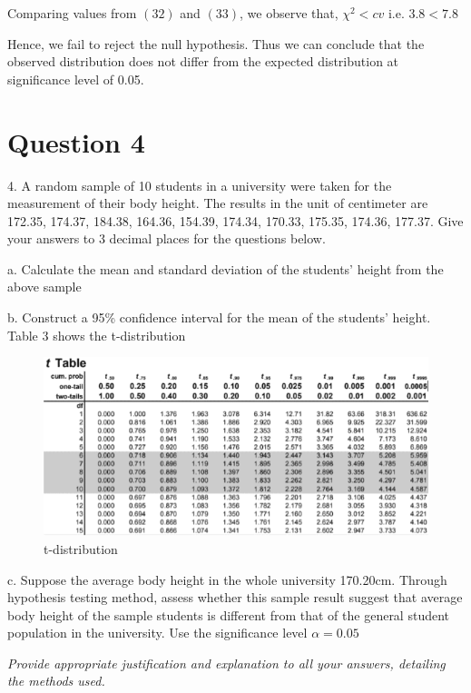 \documentclass[a4paper]{report}
\begin{document}
Comparing values from $(32)$ and $(33)$, we observe that, $\chi ^2<cv$ i.e. $3.8<7.8$

Hence, we fail to reject the null hypothesis. Thus we can conclude that the observed distribution does not differ from the expected distribution at significance level of 0.05.



\newpage
\section*{Question 4}

4.	A random sample of 10 students in a university were taken for the measurement of their body height. The results in the unit of centimeter are {172.35, 174.37, 184.38, 164.36, 154.39, 174.34, 170.33, 175.35, 174.36, 177.37}. Give your answers to 3 decimal places for the questions below.

a.	Calculate the mean and standard deviation of the students’ height from the above sample     

b.	Construct a 95\% confidence interval for the mean of the students’ height. Table 3 shows the t-distribution  



\begin{figure}[htbp]
    \centering
    \includegraphics[width=1.0\linewidth]{t-dist.png}
    \caption{t-distribution}
    \label{fig:enter-label}
\end{figure}

c.  Suppose the average body height in the whole university 170.20cm. Through hypothesis testing method, assess whether this sample result suggest that average body height of the sample students is different from that of the general student population in the university. Use the significance level $\alpha =0.05$

\textit{Provide appropriate justification and explanation to all your answers, detailing the methods used.}
\end{document}
